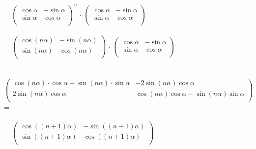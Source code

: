 \documentclass[12pt, a4paper]{article}
\begin{document}
	=
	\begin{math}
		\left(
		\begin{array}{rr}
			\cos\alpha  & -\sin\alpha \\
			\sin\alpha & \cos\alpha \\
		\end{array}
		\right ) ^{n}
	\end{math}
	$\cdot$
	\begin{math}
		\left(
		\begin{array}{rr}
			\cos\alpha  & -\sin\alpha \\
			\sin\alpha & \cos\alpha \\
		\end{array}
		\right )
	\end{math}
	=\\\\
	=
	\begin{math}
		\left(
		\begin{array}{rr}
			\cos (n\alpha)  & -\sin (n\alpha) \\
			\sin (n\alpha) & \cos (n\alpha) \\
		\end{array}
		\right )
	\end{math}
	$\cdot$
	\begin{math}
		\left(
		\begin{array}{rr}
			\cos\alpha  & -\sin\alpha \\
			\sin\alpha & \cos\alpha \\
		\end{array}
		\right )
	\end{math}
	=\\\\
	=
	\begin{math}
		\left(
		\begin{array}{rr}
			\cos (n\alpha) \cdot \cos\alpha - \sin (n\alpha) \cdot \sin\alpha & -2\sin (n\alpha)\cos\alpha \\
			2\sin (n\alpha)\cos\alpha & \cos(n\alpha)\cos\alpha - \sin (n\alpha)\sin\alpha \\
		\end{array}
		\right )
	\end{math}
	=\\\\
	=
	\begin{math}
		\left(
		\begin{array}{rr}
			\cos ((n + 1)\alpha)  & -\sin ((n + 1)\alpha) \\
			\sin ((n + 1)\alpha) & \cos ((n + 1)\alpha) \\
		\end{array}
		\right )
	\end{math}
\end{document}
